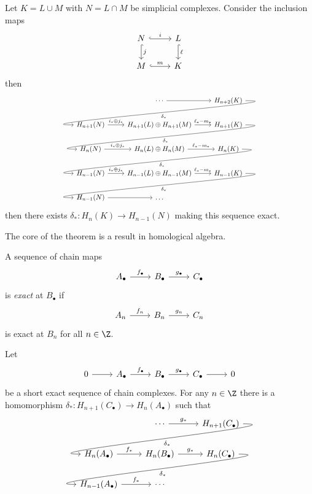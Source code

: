 \documentclass[a4paper]{article}
\begin{document}
\begin{theorem}
  \label{thm:Mayer-Vietoris}
  Let \(K = L \cup M\) with \(N = L \cap M\) be simplicial complexes. Consider the inclusion maps
  \[
    \begin{tikzcd}
      N \ar[r, hook, "i"] \ar[d, hook, "j"] & L \ar[d, hook, "\ell"] \\
      M \ar[r, hook, "m"] & K
    \end{tikzcd}
  \]
  then
  \[
    \begin{tikzcd}
      & \cdots \ar[r] & H_{n + 2}(K) \ar[dll, out=0, in=180, "\delta_*"] \\
      H_{n + 1}(N) \ar[r, "i_* \oplus j_*"] & H_{n + 1}(L) \oplus H_{n + 1}(M) \ar[r, "\ell_* - m_*"] & H_{n + 1}(K) \ar[dll, out=0, in=180, "\delta_*"] \\
      H_{n}(N) \ar[r, "i_* \oplus j_*"] & H_{n}(L) \oplus H_{n}(M) \ar[r, "\ell_* - m_*"] & H_n(K) \ar[dll, out=0, in=180, "\delta_*"] \\
      H_{n - 1}(N) \ar[r, "i_* \oplus j_*"] & H_{n - 1}(L) \oplus H_{n - 1}(M) \ar[r, "\ell_* - m_*"] & H_{n - 1}(K) \ar[dll, out=0, in=180, "\delta_*"] \\
      H_{n - 1}(N) \ar[r] & \dots
    \end{tikzcd}
  \]
  then there exists \(\delta_*: H_n(K) \to H_{n - 1}(N)\) making this sequence exact.
\end{theorem}

The core of the theorem is a result in homological algebra.

\begin{definition}
  A sequence of chain maps
  \[
    \begin{tikzcd}
      A_\bullet \ar[r, "f_\bullet"] & B_\bullet \ar[r, "g_\bullet"] & C_\bullet 
    \end{tikzcd}
  \]
  is \emph{exact} at \(B_\bullet\) if
  \[
    \begin{tikzcd}
      A_n \ar[r, "f_n"] & B_n \ar[r, "g_n"] & C_n
    \end{tikzcd}
  \]
  is exact at \(B_n\) for all \(n \in \Z\).
\end{definition}

\begin{lemma}
  Let
  \[
    \begin{tikzcd}
      0 \ar[r] & A_\bullet \ar[r, "f_\bullet"] & B_\bullet \ar[r, "g_\bullet"] & C_\bullet \ar[r] & 0
    \end{tikzcd}
  \]
  be a short exact sequence of chain complexes. For any \(n \in \Z\) there is a homomorphism \(\delta_*: H_{n + 1}(C_\bullet) \to H_n(A_\bullet)\) such that
  \[
    \begin{tikzcd}
      & \cdots \ar[r, "g_*"] & H_{n + 1}(C_\bullet) \ar[dll, out=0, in=180, "\delta_*"] \\
      H_n(A_\bullet) \ar[r, "f_*"] & H_n(B_\bullet) \ar[r, "g_*"] & H_n(C_\bullet) \ar[dll, out=0, in=180, "\delta_*"] \\
      H_{n - 1}(A_\bullet) \ar[r, "f_*"] & \cdots
    \end{tikzcd}
  \]
\end{lemma}
\end{document}
